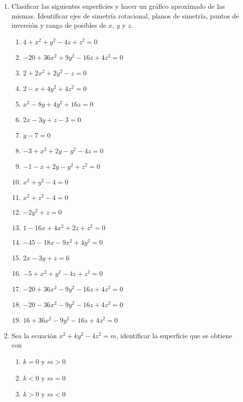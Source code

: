 \documentclass[a4paper]{article}
\newcommand{\exercise}{\item}
\begin{document}
\begin{enumerate}
\begin{multicols}{2}
\begin{enumerate} [label=(\alph*)]
	\end{enumerate}
	\end{multicols}

	\exercise Clasificar las siguientes superficies y hacer un gráfico aproximado de las mismas. Identificar ejes de simetría rotacional, planos de simetría, puntos de inversión y rango de posibles de $x$, $y$ y $z$.
	\begin{multicols}{2}
	\begin{enumerate} [label=(\alph*)]
		
		\item $4+x^2+y^2-4z+z^2=0$
		\item $-20+36x^2+9y^2-16z+4z^2=0$
		\item $2+2x^2+2y^2-z=0$
		\item $2-x+4y^2+4z^2=0$
		\item $x^2-8y+4y^2+16z=0$
		\item $2x-3y+z-3=0$
		\item $y-7=0$
		\item $-3+x^2+2y-y^2-4z=0$
		\item $-1-x+2y-y^2+z^2=0$
		\item $x^2+y^2-4=0$
		\item $x^2+z^2-4=0$
		\item $-2y^2+z=0$
		\item $1-16x+4x^2+2z+z^2=0$
		\item $-45-18x-9x^2+4y^2=0$
		\item $2x-3y+z=6$
		\item $-5+x^2+y^2-4z+z^2=0$
		\item $-20+36x^2-9y^2-16z+4z^2=0$
		\item $-20-36x^2-9y^2-16z+4z^2=0$
		\item $16+36x^2-9y^2-16z+4z^2=0$

	\end{enumerate}
	\end{multicols}


	\exercise Sea la ecuación $x^2+ky^2-4z^2=m$, identificar la superficie que se obtiene con
	\begin{multicols}{2}
	\begin{enumerate} [label=(\alph*)]
		
		\item $k=0$ y $m>0$
		\item $k<0$ y $m=0$
		\item $k>0$ y $m<0$

	\end{enumerate}
	\end{multicols}



\end{enumerate}
\end{document}
